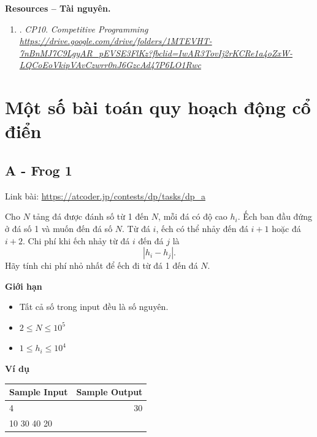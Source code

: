 \documentclass{article}
\begin{document}
\textbf{\textsf{Resources -- Tài nguyên.}}
\begin{enumerate}
	\item \cite{CP10}. {\it CP10}. \it Competitive Programming \url{https://drive.google.com/drive/folders/1MTEVHT-7nBnMJ7C9LgyAR_pEVSE3FlKz?fbclid=IwAR3TovIj2rKCRe1a4oZxW-LQCoEoVkipVAvCzwrr0nJ6GzcAd47P6LO1Rwc}

\end{enumerate}


\section{Một số bài toán quy hoạch động cổ điển}
\subsection{A - Frog 1}
Link bài: \url{https://atcoder.jp/contests/dp/tasks/dp_a}

\begin{tcolorbox}[
    colback=blue!5,        %
    colframe=blue!75!black,%
    title={Đề bài}
]
Cho $N$ tảng đá được đánh số từ 1 đến $N$, mỗi đá có độ cao $h_i$. 
Ếch ban đầu đứng ở đá số 1 và muốn đến đá số $N$. 
Từ đá $i$, ếch có thể nhảy đến đá $i+1$ hoặc đá $i+2$. 
Chi phí khi ếch nhảy từ đá $i$ đến đá $j$ là 
\[
    |h_i - h_j|.
\]
Hãy tính chi phí nhỏ nhất để ếch đi từ đá 1 đến đá $N$.
\end{tcolorbox}

\textbf{Giới hạn}
\begin{itemize}
    \item Tất cả số trong input đều là số nguyên.
    \item $2 \leq N \leq 10^5$
    \item $1 \leq h_i \leq 10^4$
\end{itemize}

\textbf{Ví dụ}

\begin{table}[h]
    \centering
    \begin{tabular}{|l|r|}
        \hline
        \textbf{Sample Input} & \textbf{Sample Output} \\
        \hline
		4& 30 \\ 
		10 30 40 20&  \\ 
		\hline
    \end{tabular}
\end{table}
\end{document}
